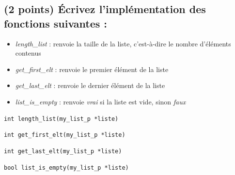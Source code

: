 \documentclass[11pt,a4paper]{article}
\begin{document}
\bigskip

\begin{center}
\end{center}

\bigskip

\subsection{(2 points) \'Ecrivez l'implémentation des fonctions suivantes : }

\begin{itemize}
\item \textit{length\_list} : renvoie la taille de la liste, c'est-à-dire le nombre d'éléments contenus
\item \textit{get\_first\_elt} : renvoie le premier élément de la liste
\item \textit{get\_last\_elt} : renvoie le dernier élément de la liste
\item \textit{list\_is\_empty} : renvoie \textit{vrai} si la liste est vide, sinon \textit{faux}
\end{itemize}

\bigskip

\texttt{int length\_list(my\_list\_p *liste)}

\begin{center}
\end{center}


\vfillLast

\newpage

\vfillFirst

\texttt{int get\_first\_elt(my\_list\_p *liste)}

\begin{center}
\end{center}

\medskip

\texttt{int get\_last\_elt(my\_list\_p *liste)}

\begin{center}
\end{center}

\medskip

\texttt{bool list\_is\_empty(my\_list\_p *liste)}

\begin{center}
\end{center}
\end{document}
